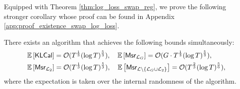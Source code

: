 Equipped with Theorem \ref{thm:log_loss_swap_reg}, we prove the following stronger corollary whose proof can be found in Appendix \ref{app:proof_existence_swap_log_loss}. 


\begin{corollary}\label{cor:simutaneous_bounds_msr}
    There exists an algorithm that achieves the following bounds simultaneously: 
        \begin{align*}
        &\mathbb{E}\left[ \mathsf{KLCal} \right] = \mathcal{O}(T^{\frac{1}{3}} (\log T) ^ {\frac{5}{3}}), \quad
        \mathbb{E}\left[ \mathsf{Msr}_{\mathcal{L}_{G}} \right] = \mathcal{O}(G \cdot T^{\frac{1}{3}} (\log T) ^ {\frac{5}{3}}), \\ 
        &\mathbb{E}\left[ \mathsf{Msr}_{\mathcal{L}_{2}} \right] = \mathcal{O}(T^{\frac{1}{3}} (\log T) ^ {\frac{5}{3}}), \quad \mathbb{E}\left[ \mathsf{Msr}_{\mathcal{L}\backslash\{\mathcal{L}_{G} \cup \mathcal{L}_{2}\}} \right] = \mathcal{O}(T^{\frac{2}{3}} (\log T) ^ {\frac{5}{6}}),
        \end{align*}
where the expectation is taken over the internal randomness of the algorithm.
\end{corollary}